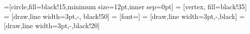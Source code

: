\documentclass[12pt, oneandhalf, chaparabic, sees, ms]{metu}
\begin{document}
 
 
 
 
 
 
 
 

 =[circle,fill=black!15,minimum size=12pt,inner sep=0pt]
  = [vertex, fill=black!35]
  = [draw,line width=3pt,-, black!50]
  = [font=\small]
  = [draw,line width=3pt,-,black]
  = [draw,line width=3pt,-,black!20]
 
%  
%  

 
 
\end{document}
